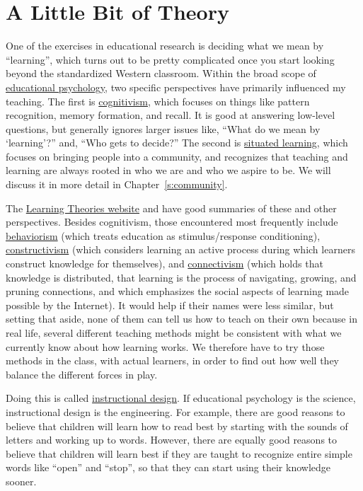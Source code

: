 \chapter{A Little Bit of Theory}\label{s:theory}

One of the exercises in educational research is deciding what we mean
by ``learning'', which turns out to be pretty complicated once you start
looking beyond the standardized Western classroom. Within the broad
scope of \protect\hyperlink{g:educational-psychology}{educational psychology}, two
specific perspectives have primarily influenced my teaching. The first
is \protect\hyperlink{g:cognitivism}{cognitivism}, which focuses on things like pattern
recognition, memory formation, and recall. It is good at answering
low-level questions, but generally ignores larger issues like, ``What
do we mean by `learning'?'' and, ``Who gets to decide?'' The second is
\protect\hyperlink{g:situated-learning}{situated learning}, which focuses on bringing
people into a community, and recognizes that teaching and learning are
always rooted in who we are and who we aspire to be. We will discuss
it in more detail in Chapter~\ref{s:community}.

The \href{http://www.learning-theories.com/}{Learning Theories website} and
\cite{Wibu2016} have good summaries of these and other
perspectives. Besides cognitivism, those encountered most frequently
include \protect\hyperlink{g:behaviorism}{behaviorism} (which treats education as
stimulus/response conditioning), \protect\hyperlink{g:constructivism}{constructivism}
(which considers learning an active process during which learners
construct knowledge for themselves), and
\protect\hyperlink{g:connectivism}{connectivism} (which holds that knowledge is
distributed, that learning is the process of navigating, growing, and
pruning connections, and which emphasizes the social aspects of
learning made possible by the Internet). It would help if their names
were less similar, but setting that aside, none of them can tell us
how to teach on their own because in real life, several different
teaching methods might be consistent with what we currently know about
how learning works. We therefore have to try those methods in the
class, with actual learners, in order to find out how well they
balance the different forces in play.

Doing this is called \protect\hyperlink{g:instructional-design}{instructional design}.
If educational psychology is the science, instructional design is the
engineering. For example, there are good reasons to believe that
children will learn how to read best by starting with the sounds of
letters and working up to words. However, there are equally good
reasons to believe that children will learn best if they are taught to
recognize entire simple words like ``open'' and ``stop'', so that they can
start using their knowledge sooner.

